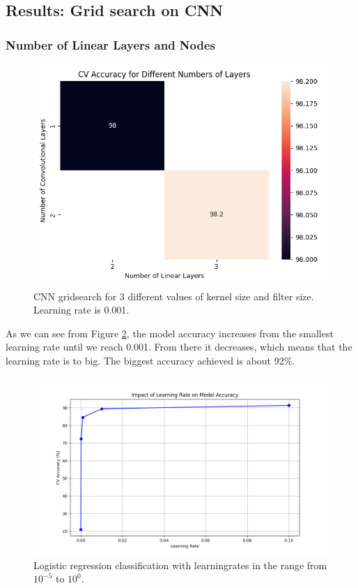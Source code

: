 \subsection{Results: Grid search on CNN}

\subsubsection{Number of Linear Layers and Nodes}



\begin{figure}[H]
    \centering
    \includegraphics[width=\textwidth]{results/cnn_grid_search/heatmap_grid_search_layers.png}
    \caption{CNN gridsearch for 3 different values of kernel size and filter size. Learning rate is 0.001.}
    \label{fig:LogRegEpochs}
\end{figure}

\newpage
As we can see from Figure \ref{fig:LogRegLearningRate}, the model accuracy increases from the smallest learning rate until we reach 0.001. From there it decreases, which means that the learning rate is to big. The biggest accuracy achieved is about 92\%.

\begin{figure}[H]
    \centering
    \includegraphics[width=\textwidth]{results/logreg/learning_rate_study.png}
    \caption{Logistic regression classification with learningrates in the range from $10^{-5}$ to $10^0$.}
    \label{fig:LogRegLearningRate}
\end{figure}

